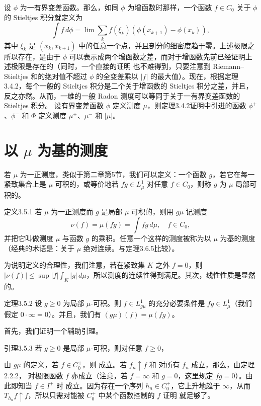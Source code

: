 设 $\phi$ 为一有界变差函数。那么，如同 $\phi$ 为增函数时那样，一个函数 $f\in C_0$ 关于 $\phi$ 的 Stieltjes 积分就定义为
\[\int f\,d\phi=\lim\sum_kf(\xi_k)(\phi(x_{k+1})-\phi(x_k)),\]
其中 $\xi_k$ 是 $(x_k,x_{k+1})$ 中的任意一个点，并且剖分的细密度趋于零。上述极限之所以存在，是由于 $\phi$ 可以表示成两个增函数之差，而对于增函数先前已经证明上述极限是存在的（同时，一个直接的证明
也不难得到，只要注意到 Riemann--Stieltjes 和的绝对值不超过 $\phi$ 的全变差乘以 $|f|$ 的最大值）。现在，根据定理3.4.2，每个一般的 Stieltjes 积分是二个关于增函数的 Stieltjes 积分之差，并且，反之亦然。从而，一维的一般 Radon 测度可以等同于关于一有界变差函数的 Stieltjes 积分。
\Exercise 设有界变差函数 $\phi$ 定义测度 $\mu$，则定理3.4.2证明中引进的函数 $\phi^+$、$\phi^-$ 和 $\Phi$ 定义测度 $\mu^+$、$\mu^-$ 和 $|\mu|$。
\section{以 \texorpdfstring{$\mu$}{μ} 为基的测度}
若 $\mu$ 为一正测度，类似于第二章第5节，我们可以定义：一个函数 $g$，若它在每一紧致集合上是 $\mu$ 可积的，或等价地若 $fg\in L^1_\mu$ 对任意 $f\in C_0$，则称 $g$ 为 $\mu$ 局部可积的。
\begin{statement}{定义}{3.5.1}
若 $\mu$ 为一正测度而 $g$ 是局部 $\mu$ 可积的，则用 $g\mu$ 记测度
\[\nu(f)=\mu(fg)=\int fg\,d\mu,\quad f\in C_0,\]
并把它叫做测度 $\mu$ 与函数 $g$ 的乘积。任意一个这样的测度被称为以 $\mu$ 为基的测度（经典的术语是：关于 $\mu$ 绝对连续。与定理3.6.5比较）。
\end{statement}
为说明定义的合理性，我们注意，若在紧致集 $K$ 之外 $f=0$，则 $|\nu(f)|\le\sup|f|\int_K|g|\,d\mu$，所以测度的连续性得到满足。其次，线性性质是显然的。
\begin{statement}{定理}{3.5.2}
设 $g\ge0$ 为局部 $\mu$-可积。则 $f\in L^1_{g\mu}$ 的充分必要条件是 $fg\in L^1_\mu$（我们假定 $0\cdot\infty=0$）。并且，我们有 $(g\mu)(f)=\mu(fg)$。
\end{statement}
首先，我们证明一个辅助引理。
\begin{statement}{引理}{3.5.3}
若 $g\ge0$ 是局部 $\mu$-可积，则对任意 $f\ge0$，
\end{statement}
\Proof 由 $g\mu$ 的定义，若 $f\in C_0^+$，则  成立。若 $f_n\uparrow f$ 和
 对所有 $f_n$ 成立，那么，由定理2.2.2， 对极限函数 $f$ 亦成立（注意，若 $f=\infty$ 和 $g=0$，这里规定 $fg=0$）。由此即知当 $f\in I^+$ 时  成立。因为存在一个序列 $h_n\in C_0^+$，它上升地趋于 $\infty$，从而 $T_{h_n}f\uparrow f$，所以只需对能被 $C_0^+$ 中某个函数控制的 $f$ 证明  就足够了。

